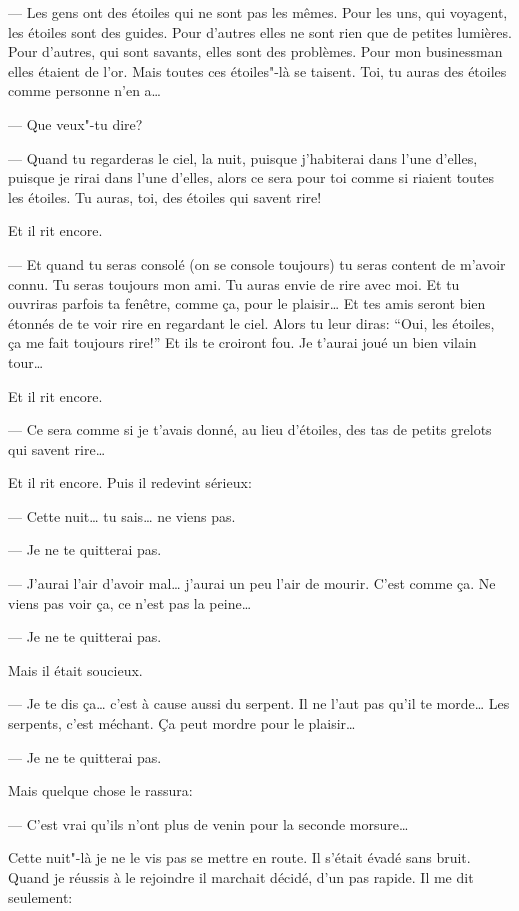 --- Les gens ont des étoiles qui ne sont pas les mêmes. Pour les uns, qui
voyagent, les étoiles sont des guides. Pour d'autres elles ne sont rien que
de petites lumières. Pour d’autres, qui sont savants, elles sont des problèmes.
Pour mon businessman elles étaient de l'or. Mais toutes ces étoiles"-là se
taisent. Toi, tu auras des étoiles comme personne n'en a\ldots{}

--- Que veux"-tu dire?

--- Quand tu regarderas le ciel, la nuit, puisque j'habiterai dans l'une
d'elles, puisque je rirai dans l'une d'elles, alors ce sera pour toi comme si
riaient toutes les étoiles. Tu auras, toi, des étoiles qui savent rire!

Et il rit encore.

--- Et quand tu seras consolé (on se console toujours) tu seras content de
m'avoir connu. Tu seras toujours mon ami. Tu auras envie de rire avec moi. Et
tu ouvriras parfois ta fenêtre, comme ça, pour le plaisir\ldots{} Et tes amis
seront bien étonnés de te voir rire en regardant le ciel. Alors tu leur diras:
``Oui, les étoiles, ça me fait toujours rire!'' Et ils te croiront fou. Je
t'aurai joué un bien vilain tour\ldots{}

Et il rit encore.

--- Ce sera comme si je t'avais donné, au lieu d'étoiles, des tas de petits
grelots qui savent rire\ldots{}

Et il rit encore. Puis il redevint sérieux:

--- Cette nuit\ldots{} tu sais\ldots{} ne viens pas.

--- Je ne te quitterai pas.

--- J'aurai l'air d'avoir mal\ldots{} j'aurai un peu l'air de mourir. C'est
comme ça. Ne viens pas voir ça, ce n'est pas la peine\ldots{}

--- Je ne te quitterai pas.

Mais il était soucieux.

--- Je te dis ça\ldots{} c’est à cause aussi du serpent. Il ne l'aut pas qu'il
te morde\ldots{} Les serpents, c'est méchant. Ça peut mordre pour le plaisir\ldots{}

--- Je ne te quitterai pas.

Mais quelque chose le rassura:

--- C'est vrai qu'ils n'ont plus de venin pour la seconde morsure\ldots{}

\medskip

Cette nuit"-là je ne le vis pas se mettre en route. Il s’était évadé sans bruit.
Quand je réussis à le rejoindre il marchait décidé, d’un pas rapide. Il me dit
seulement:

